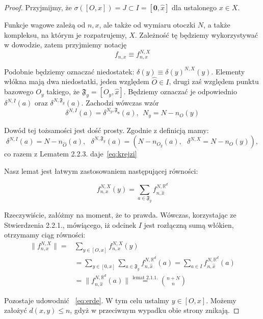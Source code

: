 \documentclass[licencjacka]{pracamgr}
\theoremstyle{definition}
\theoremstyle{definition}
\theoremstyle{definition}
\theoremstyle{definition}
\theoremstyle{definition}
\theoremstyle{plain}
\theoremstyle{plain}
\begin{document}
\begin{proof}	
	Przyjmijmy, że $ \sigma([O,x]) = J \subset I = [\textbf{0}, \hat x] $ dla ustalonego 
	$ x \in X $.
	
	Funkcje wagowe zależą od $ n, x$, ale także od wymiaru otoczki $ N $, a także 
	kompleksu, na którym je rozpatrujemy, $ X $. Zależność tę będziemy wykorzystywać w dowodzie, 
	zatem przyjmiemy notację
	$$ f_{n,x} \equiv f_{n,x}^{N,X} $$ 

	Podobnie będziemy oznaczać niedostatek: $ \delta(y) \equiv \delta(y)^{N,X}(y) $. 
	Elementy włókna mają dwa niedostatki, jeden względem $ \hat O \in I $, drugi zaś 
	względem punktu bazowego $ O_y $ takiego, że $ \mathfrak{F}_y = [O_y, \hat x] $. 
	Będziemy oznaczać je odpowiednio $ \delta^{N,I}(a)$ oraz $ \delta^{N, \mathfrak{F}_y}(a) $. 
	Zachodzi wówczas wzór
	\begin{equation}\label{eq:krejzi}
	\delta^{N,I}(a) = \delta^{N_y, \mathfrak{F_y}}(a), ~~ N_y = N - n_O(y)
	\end{equation}
		
	Dowód tej tożsamości jest dość prosty. Zgodnie z definicją mamy:
	$$ \delta^{N,I}(a) = N - n_{\hat O}(a), ~~~ \delta^{N, \mathfrak{F}_y}(a) = \left( 
	N - n_{O_y}(a), ~~~ \delta^{N,X} = N - n_O(y)\right), $$
	co razem z Lematem 2.2.3. daje~\ref{eq:krejzi}

	Nasz lemat jest łatwym zastosowaniem następującej równości:

	\begin{equation} \label{eq:erde}
		f_{n,x}^{N,X}(y) = \sum\limits_{a \in \mathfrak{F}_y} f_{n,\hat x}^{N, \mathbb{R}^d}
	\end{equation}

	Rzeczywiście, załóżmy na moment, że to prawda. Wówczas, korzystając ze Stwierdzenia 2.2.1., 
	mówiącego, iż odcinek $ I $ jest rozłączną sumą włókien, otrzymamy ciąg równości:
	\begin{align*}
	 \| f_{n,x}^{N,X}\|= &\sum\limits_{y \in [O,x]} f_{n,x}^{N,X}(y) \\
	 &= \sum\limits_{y \in [0,x]} \sum \limits_{a \in \mathfrak{F}_y} f_{n,\hat x}^{N, 
	\mathbb{R}^d} (a)  = \sum\limits_{a \in I} f_{n,\hat x}^{N, \mathbb{R}^d}(a) \\
	& = \| f_{n, \hat x}^{N, \mathbb{R}^d} (a)\| \stackrel{\text{lemat 2.1.1.}}{=} {n + N \choose n}
	\end{align*}

	Pozostaje udowodnić ~\ref{eq:erde}. W tym celu ustalmy $ y \in [O,x] $. Możemy 
	założyć $ d(x,y) \leq n $, gdyż w przeciwnym wypadku obie strony znikają.


\end{proof}
\end{document}
